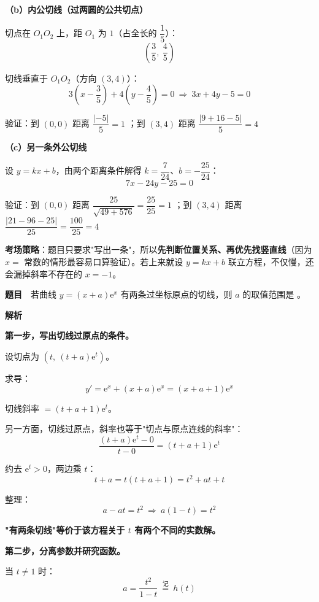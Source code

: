 \textbf{（b）内公切线（过两圆的公共切点）}

切点在 $O_1O_2$ 上，距 $O_1$ 为 $1$（占全长的 $\dfrac15$）：
\[\left(\frac35,\ \frac45\right)\]

切线垂直于 $O_1O_2$（方向 $(3,4)$）：
\[3\left(x-\frac35\right)+4\left(y-\frac45\right)=0\ \Longrightarrow\ 3x+4y-5=0\]

验证：到 $(0,0)$ 距离 $\dfrac{|-5|}5=1$ ；到 $(3,4)$ 距离 $\dfrac{|9+16-5|}5=4$ 

\textbf{（c）另一条外公切线}

设 $y=kx+b$，由两个距离条件解得 $k=\dfrac7{24}$、$b=-\dfrac{25}{24}$：
\[7x-24y-25=0\]

验证：到 $(0,0)$ 距离 $\dfrac{25}{\sqrt{49+576}}=\dfrac{25}{25}=1$ ；到 $(3,4)$ 距离 $\dfrac{|21-96-25|}{25}=\dfrac{100}{25}=4$ 


\begin{gktip}
\textbf{考场策略}：题目只要求"写出一条"，所以\textbf{先判断位置关系、再优先找竖直线}（因为 $x=$ 常数的情形最容易口算验证）。若上来就设 $y=kx+b$ 联立方程，不仅慢，还会漏掉斜率不存在的 $x=-1$。
\end{gktip}

\par\medskip


\textbf{题目}　若曲线 $y=(x+a)\mathrm e^{x}$ 有两条过坐标原点的切线，则 $a$ 的取值范围是 \gkblank{}。

\textbf{解析}

\textbf{第一步，写出切线过原点的条件。}

设切点为 $\left(t,\ (t+a)\mathrm e^{t}\right)$。

求导：
\[y'=\mathrm e^{x}+(x+a)\mathrm e^{x}=(x+a+1)\mathrm e^{x}\]

切线斜率 $=(t+a+1)\mathrm e^{t}$。

另一方面，切线过原点，斜率也等于"切点与原点连线的斜率"：
\[\frac{(t+a)\mathrm e^{t}-0}{t-0}=(t+a+1)\mathrm e^{t}\]

约去 $\mathrm e^{t}>0$，两边乘 $t$：
\[t+a=t(t+a+1)=t^{2}+at+t\]

整理：
\[a-at=t^{2}\ \Longrightarrow\ a(1-t)=t^{2}\]

\textbf{"有两条切线"等价于该方程关于 $t$ 有两个不同的实数解。}

\textbf{第二步，分离参数并研究函数。}

当 $t\ne1$ 时：
\[a=\frac{t^{2}}{1-t}\ \overset{\text{记}}{=}\ h(t)\]

